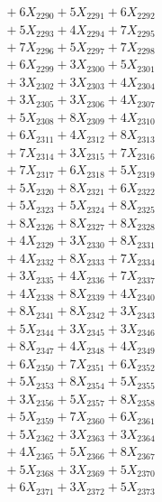 \documentclass[a4paper,10pt]{article}
\begin{document}
{\begin{align}
&\;  + 6 X_{2290} + 5 X_{2291} + 6 X_{2292} \\[0.3ex]
&\;  + 5 X_{2293} + 4 X_{2294} + 7 X_{2295} \\[0.3ex]
&\;  + 7 X_{2296} + 5 X_{2297} + 7 X_{2298} \\[0.3ex]
&\;  + 6 X_{2299} + 3 X_{2300} + 5 X_{2301} \\[0.3ex]
&\;  + 3 X_{2302} + 3 X_{2303} + 4 X_{2304} \\[0.3ex]
&\;  + 3 X_{2305} + 3 X_{2306} + 4 X_{2307} \\[0.3ex]
&\;  + 5 X_{2308} + 8 X_{2309} + 4 X_{2310} \\[0.3ex]
&\;  + 6 X_{2311} + 4 X_{2312} + 8 X_{2313} \\[0.3ex]
&\;  + 7 X_{2314} + 3 X_{2315} + 7 X_{2316} \\[0.3ex]
&\;  + 7 X_{2317} + 6 X_{2318} + 5 X_{2319} \\[0.5ex]\allowbreak
&\;  + 5 X_{2320} + 8 X_{2321} + 6 X_{2322} \\[0.3ex]
&\;  + 5 X_{2323} + 5 X_{2324} + 8 X_{2325} \\[0.3ex]
&\;  + 8 X_{2326} + 8 X_{2327} + 8 X_{2328} \\[0.3ex]
&\;  + 4 X_{2329} + 3 X_{2330} + 8 X_{2331} \\[0.3ex]
&\;  + 4 X_{2332} + 8 X_{2333} + 7 X_{2334} \\[0.3ex]
&\;  + 3 X_{2335} + 4 X_{2336} + 7 X_{2337} \\[0.3ex]
&\;  + 4 X_{2338} + 8 X_{2339} + 4 X_{2340} \\[0.3ex]
&\;  + 8 X_{2341} + 8 X_{2342} + 3 X_{2343} \\[0.3ex]
&\;  + 5 X_{2344} + 3 X_{2345} + 3 X_{2346} \\[0.3ex]
&\;  + 8 X_{2347} + 4 X_{2348} + 4 X_{2349} \\[0.5ex]\allowbreak
&\;  + 6 X_{2350} + 7 X_{2351} + 6 X_{2352} \\[0.3ex]
&\;  + 5 X_{2353} + 8 X_{2354} + 5 X_{2355} \\[0.3ex]
&\;  + 3 X_{2356} + 5 X_{2357} + 8 X_{2358} \\[0.3ex]
&\;  + 5 X_{2359} + 7 X_{2360} + 6 X_{2361} \\[0.3ex]
&\;  + 5 X_{2362} + 3 X_{2363} + 3 X_{2364} \\[0.3ex]
&\;  + 4 X_{2365} + 5 X_{2366} + 8 X_{2367} \\[0.3ex]
&\;  + 5 X_{2368} + 3 X_{2369} + 5 X_{2370} \\[0.3ex]
&\;  + 6 X_{2371} + 3 X_{2372} + 5 X_{2373} \\[0.3ex]

\end{align}}
\end{document}
